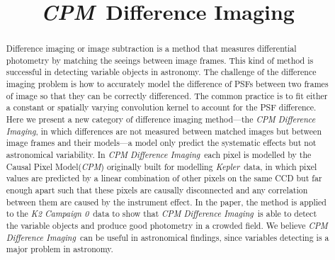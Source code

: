 \documentclass[12pt, preprint]{aastex}
\newcommand{\project}[1]{\textsl{#1}}
\newcommand{\cpm}{\project{CPM}}
\newcommand{\cpmdiff}{\project{CPM Difference Imaging}}
\newcommand{\kepler}{\project{Kepler}}
\newcommand{\KTCZ}{\project{K2 Campaign 0}}
\begin{document}
\title{\cpm\ Difference Imaging}
\author{}

\begin{abstract}
Difference imaging or image subtraction is a method that measures differential photometry by matching the seeings between image frames. 
This kind of method is successful in detecting variable objects in astronomy. The challenge of the difference imaging problem is how to accurately model the difference of PSFs between two frames of image so that they can be correctly differenced. The common practice is to fit either a constant or spatially varying convolution kernel to account for the PSF difference.
Here we present a new category of difference imaging method---the \cpmdiff, in which differences are not measured between matched images but between image frames and their models---a model only predict the systematic effects but not astronomical variability. 
In \cpmdiff\,  each pixel is modelled by the Causal Pixel Model(\cpm) originally built for modelling \kepler\ data, in which pixel values are predicted by a linear combination of other pixels on the same CCD but far enough apart such that these pixels are causally disconnected and any correlation between them are caused by the instrument effect. 
In the paper, the method is applied to the \KTCZ\ data to show that \cpmdiff\ is able to detect the variable objects and produce good photometry in a crowded field. We believe \cpmdiff\ can be useful in astronomical findings, since variables detecting is a major problem in astronomy.
\end{abstract}
\end{document}
